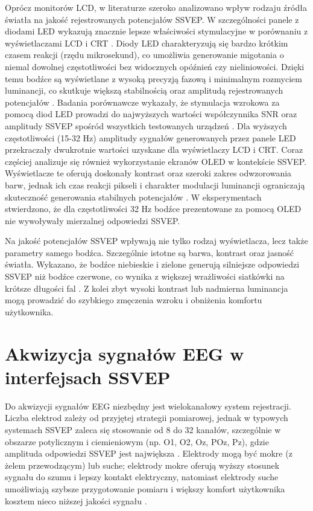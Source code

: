 Oprócz monitorów LCD, w literaturze szeroko analizowano wpływ rodzaju źródła światła na jakość rejestrowanych potencjałów SSVEP. W szczególności panele z diodami LED wykazują znacznie lepsze właściwości stymulacyjne w porównaniu z wyświetlaczami LCD i CRT \cite{wang2020}. Diody LED charakteryzują się bardzo krótkim czasem reakcji (rzędu mikrosekund), co umożliwia generowanie migotania o niemal dowolnej częstotliwości bez widocznych opóźnień czy nieliniowości. Dzięki temu bodźce są wyświetlane z wysoką precyzją fazową i minimalnym rozmyciem luminancji, co skutkuje większą stabilnością oraz amplitudą rejestrowanych potencjałów \cite{chen2015}. Badania porównawcze wykazały, że stymulacja wzrokowa za pomocą diod LED prowadzi do najwyższych wartości współczynnika SNR oraz amplitudy SSVEP spośród wszystkich testowanych urządzeń \cite{poryadina2022}. Dla wyższych częstotliwości (15-32 Hz) amplitudy sygnałów generowanych przez panele LED przekraczały dwukrotnie wartości uzyskane dla wyświetlaczy LCD i CRT. Coraz częściej analizuje się również wykorzystanie ekranów OLED w kontekście SSVEP. Wyświetlacze te oferują doskonały kontrast oraz szeroki zakres odwzorowania barw, jednak ich czas reakcji pikseli i charakter modulacji luminancji ograniczają skuteczność generowania stabilnych potencjałów \cite{poryadina2022}. W eksperymentach stwierdzono, że dla częstotliwości 32 Hz bodźce prezentowane za pomocą OLED nie wywoływały mierzalnej odpowiedzi SSVEP.

Na jakość potencjałów SSVEP wpływają nie tylko rodzaj wyświetlacza, lecz także parametry samego bodźca. Szczególnie istotne są barwa, kontrast oraz jasność światła. Wykazano, że bodźce niebieskie i zielone generują silniejsze odpowiedzi SSVEP niż bodźce czerwone, co wynika z większej wrażliwości siatkówki na krótsze długości fal \cite{wang2020, jia2010}. Z kolei zbyt wysoki kontrast lub nadmierna luminancja mogą prowadzić do szybkiego zmęczenia wzroku i obniżenia komfortu użytkownika.

\section{Akwizycja sygnałów EEG w interfejsach SSVEP}

Do akwizycji sygnałów EEG niezbędny jest wielokanałowy system rejestracji. Liczba elektrod zależy od przyjętej strategii pomiarowej, jednak w typowych systemach SSVEP zaleca się stosowanie od 8 do 32 kanałów, szczególnie w obszarze potylicznym i ciemieniowym (np. O1, O2, Oz, POz, Pz), gdzie amplituda odpowiedzi SSVEP jest największa \cite{muller2003}. Elektrody mogą być mokre (z żelem przewodzącym) lub suche; elektrody mokre oferują wyższy stosunek sygnału do szumu i lepszy kontakt elektryczny, natomiast elektrody suche umożliwiają szybsze przygotowanie pomiaru i większy komfort użytkownika kosztem nieco niższej jakości sygnału \cite{mullen2015}.

